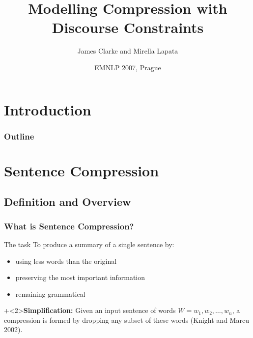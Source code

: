 \documentclass{beamer}
\title[] %
{Modelling Compression with Discourse Constraints}
\subtitle{} %
\author[James Clarke and Mirella Lapata]
{James Clarke and Mirella Lapata}
\institute[University of Edinburgh] %
{
  School of Informatics \\
  University of Edinburgh
}
\date[] %
{EMNLP 2007, Prague}
\begin{document}
\section*{Introduction}

\begin{frame}
  \titlepage
\end{frame}


\begin{frame}
  \frametitle{Outline}
  \tableofcontents
\end{frame}

\section{Sentence Compression}

\subsection{Definition and Overview}

\begin{frame}
  \frametitle{What is Sentence Compression?}

\begin{block}{The task}
To produce a summary of a single sentence by:

      \begin{itemize}
      \item using \alert{less} words than the original
      \item preserving the most \alert{important information}
      \item remaining \alert{grammatical}
      \end{itemize}
\end{block}
    
 \vspace{2ex}
\onslide+<2>{\textbf{Simplification:} 
    Given an input sentence of words $W = w_1, w_2, \dots , w_n$, a
    compression is formed by dropping any subset of these
    words (Knight and Marcu 2002). 
}
\end{frame}

\end{document}
